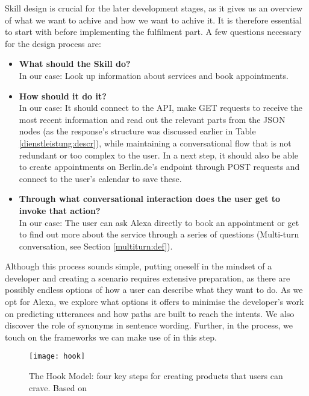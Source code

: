 Skill design is crucial for the later development stages, as it gives us an overview of what we want to achive and how we want to achive it. It is therefore essential to start with before implementing the fulfilment part. A few questions necessary for the design process are:
\begin{itemize}
\item \textbf{What should the Skill do?\\}
In our case: Look up information about services and book appointments.
\item  \textbf{How should it do it?\\}
In our case: It should connect to the API, make GET requests to receive the most recent information and read out the relevant parts from the JSON nodes (as the response's structure was discussed earlier in Table \ref{dienstleistung:descr}), while maintaining a conversational flow that is not redundant or too complex to the user. In a next step, it should also be able to create appointments on Berlin.de's endpoint through POST requests and connect to the user's calendar to save these.

\item \textbf{Through what conversational interaction does the user get to invoke that action?}\\
In our case: The user can ask Alexa directly to book an appointment or get to find out more about the service through a series of questions (Multi-turn conversation, see Section \ref{multiturn:def}).

\end{itemize}


Although this process sounds simple, putting oneself in the mindset of a developer and creating a scenario requires extensive preparation, as there are possibly endless options of how a user can describe what they want to do. As we opt for Alexa, we explore what options it offers to minimise the developer's work on predicting utterances and how paths are built to reach the intents. We also discover the role of synonyms in sentence wording. Further, in the process, we touch on the frameworks we can make use of in this step.


	
	\begin{wrapfigure}{r}{0.48\textwidth}
		\caption[Hook Model Steps]{The Hook Model: four key steps for creating products that users can crave. Based on \cite{eyal:hook}}
		\label{hookeyal}
		\texttt{[image: hook]}
	\end{wrapfigure}

